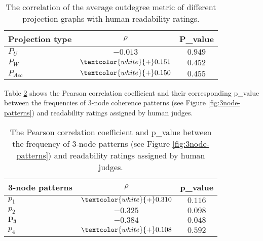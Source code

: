 \begin{table}[!ht]
	\begin{center}
		\begin{tabular}{lcc}
			\toprule
 			\textbf{Projection type}		& $\rho$  & \textbf{P\_value}\\
 			\midrule
			$P_U$ 				& $-0.013$ 						& $0.949$ \\
			$P_W$ 				& $\textcolor{white}{+}0.151$  	& $0.452$ \\
			$P_{Acc}$ 			& $\textcolor{white}{+}0.150$ 	& $0.455$ \\
			\bottomrule
		\end{tabular}
	\end{center}
	\caption{The correlation of the average outdegree metric of different projection graphs with human readability ratings.}
 	\label{tab:correlation-outdegree}
\end{table}


Table \ref{tab:correlation-3node} shows the Pearson correlation coefficient and their corresponding p\_value between the frequencies of 3-node coherence patterns (see Figure \ref{fig:3node-patterns}) and readability ratings assigned by human judges. 

\begin{table}[!ht]
	\begin{center}
		\begin{tabular}{lcc}
		\toprule
  	 	\textbf{3-node patterns} & $\rho$ 		& \textbf{p\_value}	 \\
  	 	\midrule
 		$p_1$ 			& $\textcolor{white}{+}0.310$ & $0.116$ 		\\
 		$p_2$ 			& $-0.325$ 				      & $0.098$ 		\\
		$\mathbf{p_3}$ 	& $\mathbf{-0.384}$ 		  & $\mathbf{0.048}$\\
 		$p_4$ 			& $\textcolor{white}{+}0.108$ & $0.592$			\\
 		\bottomrule
		\end{tabular}
	\end{center}
	\caption{The Pearson correlation coefficient and p\_value between the frequency of 3-node patterns (see Figure \ref{fig:3node-patterns}) and readability ratings assigned by human judges.} 
 	\label{tab:correlation-3node}
\end{table}


